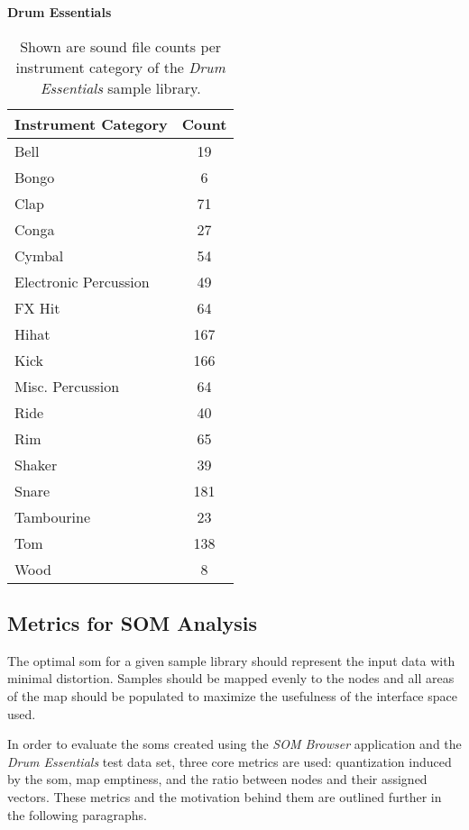 \begin{table}[!ht]
  \renewcommand{\arraystretch}{1.2}
  \centering
  \textbf{Drum Essentials} \\ [3mm]
  \footnotesize
  \begin{tabular}{ l c }
    \hline
    \textbf{Instrument Category} & \textbf{Count} \\
    \hline
    Bell & 19 \\
    Bongo & 6 \\
    Clap & 71 \\
    Conga & 27 \\
    Cymbal & 54 \\
    Electronic Percussion & 49 \\
    FX Hit & 64 \\
    Hihat & 167 \\
    Kick & 166 \\
    Misc. Percussion & 64 \\
    Ride & 40 \\
    Rim & 65 \\
    Shaker & 39 \\
    Snare & 181 \\
    Tambourine & 23 \\
    Tom & 138 \\
    Wood & 8 \\
  \end{tabular}
  \caption[\textit{Drum Essentials}: Instrument category counts]
  {Shown are sound file counts per instrument category of the
  \textit{Drum Essentials} sample library.}
  \label{table:drum_essentials_counts}
\end{table}

\subsection{Metrics for SOM Analysis}
\label{subsec:eval_som_metrics}
The optimal \gls{som} for a given sample library should represent the input data
with minimal distortion. Samples should be mapped evenly to the nodes and all
areas of the map should be populated to maximize the usefulness of the
interface space used.

\smallskip

In order to evaluate the \glspl{som} created using the \textit{SOM Browser}
application and the \textit{Drum Essentials} test data set, three core metrics
are used: quantization induced by the \gls{som}, map emptiness, and the ratio
between nodes and their assigned vectors. These metrics and the motivation
behind them are outlined further in the following paragraphs.

